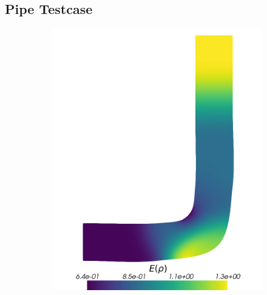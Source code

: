\subsection{Pipe Testcase}
\begin{figure}[H]
	\centering
	\begin{subfigure}{0.3\linewidth}
		\centering
		\includegraphics[scale=0.2]{figs/pipe/pipe_sc_ref_n50_E(rho).png}
		\label{fig:referenceSolutionsPipe1}
	\end{subfigure}%
	\hfill
	\begin{subfigure}{0.3\linewidth}
		\centering

\end{subfigure}
\end{figure}
